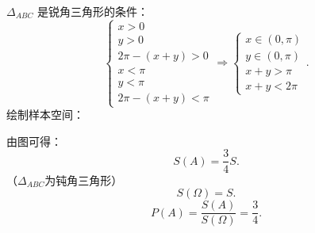 $\Delta_{ABC}$ 是锐角三角形的条件：\[
    \begin{cases}
        x>0\\
        y>0\\
        2\pi-\left( x+y \right) >0\\
        x<\pi\\
        y<\pi\\
        2\pi-\left( x+y \right) <\pi
    \end{cases}
    \Rightarrow
    \begin{cases}
        x\in \left( 0,\pi \right) \\
        y\in \left( 0,\pi \right)\\
        x+y>\pi\\
        x+y<2\pi
    \end{cases}
.\] 
绘制样本空间：
\begin{center}
\end{center}
由图可得：\[
    S\left( A \right) =\frac{3}{4}S
.\] （$\Delta_{ABC}$为钝角三角形）
\[
    S\left( \Omega \right) =S
.\] 
\[
    P\left( A \right) =\frac{S\left( A \right) }{S\left( \Omega \right) }=\frac{3}{4}
.\] 

















